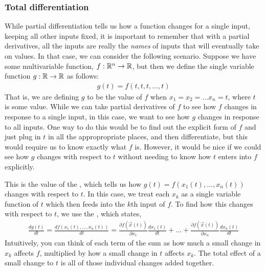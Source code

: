 \subsubsection*{Total differentiation}
While partial differentiation tells us how a function changes for a single input, keeping all other inputs fixed, it is important to remember that with a partial derivatives, all the inputs are really the \emph{names} of inputs that will eventually take on values. In that case, we can consider the following scenario. Suppose we have some multivariable function, $f: \mathbb{R}^n \to \mathbb{R}$, but then we define the single variable function $g: \mathbb{R} \to \mathbb{R}$ as follows:
\begin{align*}
    g(t) = f(t, t, t, \dots, t)
\end{align*}
That is, we are defining $g$ to be the value of $f$ when $x_1 = x_2 = \dots x_n = t$, where $t$ is some value. While we can take partial derivatives of $f$ to see how $f$ changes in response to a single input, in this case, we want to see how $g$ changes in response to all inputs. One way to do this would be to find out the explicit form of $f$ and just plug in $t$ in all the appropropriate places, and then differentiate, but this would require us to know exactly what $f$ is. However, it would be nice if we could see how $g$ changes with respect to $t$ without needing to know how $t$ enters into $f$ explicitly. 

This is the value of the , which tells us how $g(t) = f(x_1(t), \dots, x_n(t))$ changes with respect to $t$. In this case, we treat each $x_k$ as a single variable function of $t$ which then feeds into the $k$th input of $f$. To find how this changes with respect to $t$, we use the , which states,
\begin{align*}
    \frac{dg(t)}{dt} = \frac{df(x_1(t), \dots, x_n(t))}{dt} = \frac{\partial f(\vec{x}(t))}{\partial x_1} \frac{d x_1(t)}{dt} + \dots + \frac{\partial f(\vec{x}(t))}{\partial x_n} \frac{d x_n(t)}{dt}
\end{align*}
Intuitively, you can think of each term of the sum as how much a small change in $x_k$ affects $f$, multiplied by how a small change in $t$ affects $x_k$. The total effect of a small change to $t$ is all of those individual changes added together. 

